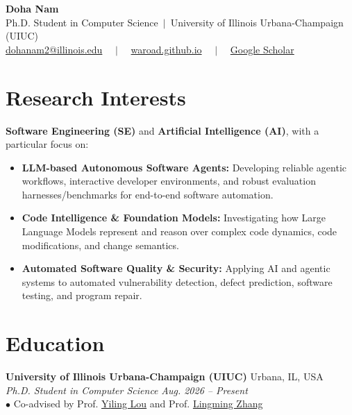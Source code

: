 \documentclass[10pt,letterpaper]{article}
\begin{document}
\begin{center}
    {\LARGE \textbf{Doha Nam}}\\[0.4em]
    {\small Ph.D. Student in Computer Science $\,\vert\,$ University of Illinois Urbana-Champaign (UIUC)}\\[0.35em]
    {\small
        \href{mailto:dohanam2@illinois.edu}{dohanam2@illinois.edu} $\quad\vert\quad$
        \href{https://waroad.github.io}{waroad.github.io} $\quad\vert\quad$
        \href{https://scholar.google.com/citations?user=eQ4Wo08AAAAJ}{Google Scholar}
    }
\end{center}
\vspace{-0.3em}

\section{Research Interests}
\vspace{0.1em}
\noindent
\textbf{Software Engineering (SE)} and \textbf{Artificial Intelligence (AI)}, with a particular focus on:
\begin{itemize}[itemsep=2.5pt, topsep=3pt]
    \item \textbf{LLM-based Autonomous Software Agents:} Developing reliable agentic workflows, interactive developer environments, and robust evaluation harnesses/benchmarks for end-to-end software automation.
    \item \textbf{Code Intelligence \& Foundation Models:} Investigating how Large Language Models represent and reason over complex code dynamics, code modifications, and change semantics.
    \item \textbf{Automated Software Quality \& Security:} Applying AI and agentic systems to automated vulnerability detection, defect prediction, software testing, and program repair.
\end{itemize}

\section{Education}

\noindent
\textbf{University of Illinois Urbana-Champaign (UIUC)} \hfill Urbana, IL, USA\\
\textit{Ph.D. Student in Computer Science} \hfill \textit{Aug. 2026 -- Present}\\
\null\quad $\bullet$ Co-advised by Prof. \href{https://yilinglou.github.io/}{Yiling Lou} and Prof. \href{https://lingming.cs.illinois.edu/}{Lingming Zhang}
\end{document}
